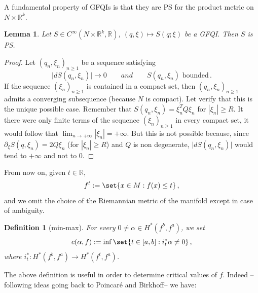 \documentclass{article}
\newcommand{\1}{\mathbbm{1}}
\newtheorem{lem}[thm]{Lemma}
\newtheorem{defn}[thm]{Definition}
\theoremstyle{remark}
\begin{document}
{{A fundamental property of GFQIs is that they are PS for the product metric on $N \times \mathbb{R}^k$.

\begin{lem}
Let $S\in C^{\infty}(N \times \mathbb{R}^k,\mathbb{R})$, $(q,\xi) \mapsto S(q;\xi)$ be a GFQI. Then $S$ is PS.
\end{lem}
\begin{proof}
Let $(q_n, \xi_n)_{n \ge 1}$ be a sequence satisfying
$$\vert{dS(q_n,\xi_n)}\vert \to 0 \qquad {and} \qquad S(q_n,\xi_n) \text{ bounded}\, .$$
If the sequence $(\xi_n)_{n \ge 1}$ is contained in a compact set, then $(q_n, \xi_n)_{n\ge 1}$ admits 
a converging subsequence (because $N$ is compact). Let verify that this is the unique possible case. Remember that $S(q_n,\xi_n) = \xi_n^T Q \xi_n$ for $|\xi_n| \ge R$. It there were only finite terms of the sequence $(\xi_n)_{n \ge 1}$ in every compact set, it would follow that $\lim_{n \to +\infty} |\xi_n| = +\infty$. But this is not possible because, since $\partial_{\xi}S(q,\xi_n) = 2 Q \xi_n$ (for $|\xi_n| \ge R$) and $Q$ is non degenerate, $\vert{dS(q_n,\xi_n)}\vert$ would tend to $+\infty$ and not to $0$.
\end{proof}
\noindent From now on, given $t \in \mathbb{R}$, 
$$f^t := \set{ x \in M: f(x) \le t}\, ,$$ 
and we omit the choice of the Riemannian metric of the manifold except in case of ambiguity. 
\begin{defn} [min-max] For every $0 \ne \alpha \in H^*(f^b,f^a)$, we set
\begin{equation} \label{min-max}
c(\alpha,f) := \inf \set{t \in [a,b]: i^*_{t} \alpha \ne 0}\, ,
\end{equation}
where $i_t^*: H^*(f^b,f^a) \to H^*(f^{t},f^a)$.     
\end{defn}

\noindent The above definition is useful in order to determine critical values of $f$. Indeed --following ideas going back to Poincar\'e and Birkhoff-- we have:

}}
\end{document}
